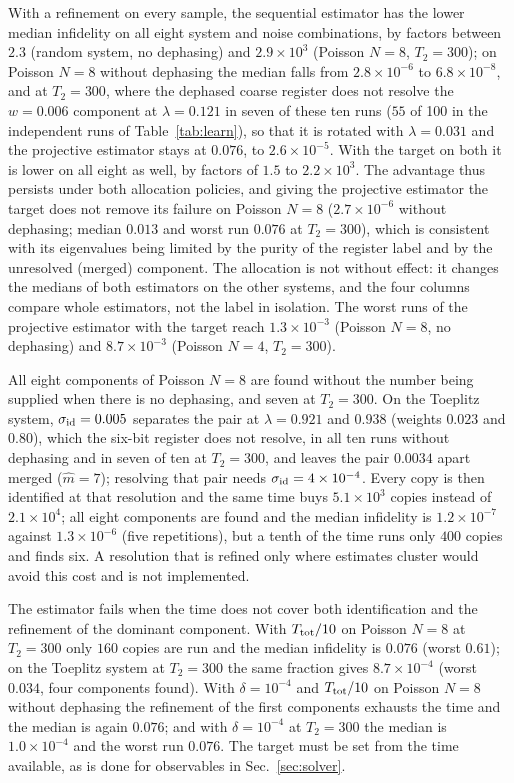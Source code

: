 \documentclass[journal]{IEEEtran}
\begin{document}
With a refinement on every sample, the sequential estimator has the lower median infidelity on all eight system and noise combinations, by factors between $2.3$ (random system, no dephasing) and $2.9\times10^3$ (Poisson $N=8$, $T_2=300$); on Poisson $N=8$ without dephasing the median falls from $2.8\times10^{-6}$ to $6.8\times10^{-8}$, and at $T_2=300$, where the dephased coarse register does not resolve the $w=0.006$ component at $\lambda=0.121$ in seven of these ten runs ($55$ of 100 in the independent runs of Table~\ref{tab:learn}), so that it is rotated with $\lambda=0.031$ and the projective estimator stays at $0.076$, to $2.6\times10^{-5}$. With the target on both it is lower on all eight as well, by factors of $1.5$ to $2.2\times10^3$. The advantage thus persists under both allocation policies, and giving the projective estimator the target does not remove its failure on Poisson $N=8$ ($2.7\times10^{-6}$ without dephasing; median $0.013$ and worst run $0.076$ at $T_2=300$), which is consistent with its eigenvalues being limited by the purity of the register label and by the unresolved (merged) component. The allocation is not without effect: it changes the medians of both estimators on the other systems, and the four columns compare whole estimators, not the label in isolation. The worst runs of the projective estimator with the target reach $1.3\times10^{-3}$ (Poisson $N=8$, no dephasing) and $8.7\times10^{-3}$ (Poisson $N=4$, $T_2=300$).

All eight components of Poisson $N=8$ are found without the number being supplied when there is no dephasing, and seven at $T_2=300$. On the Toeplitz system, $\sigma_{\rm id}=0.005$ separates the pair at $\lambda=0.921$ and $0.938$ (weights $0.023$ and $0.80$), which the six-bit register does not resolve, in all ten runs without dephasing and in seven of ten at $T_2=300$, and leaves the pair $0.0034$ apart merged ($\hat m=7$); resolving that pair needs $\sigma_{\rm id}=4\times10^{-4}$. Every copy is then identified at that resolution and the same time buys $5.1\times10^3$ copies instead of $2.1\times10^4$; all eight components are found and the median infidelity is $1.2\times10^{-7}$ against $1.3\times10^{-6}$ (five repetitions), but a tenth of the time runs only $400$ copies and finds six. A resolution that is refined only where estimates cluster would avoid this cost and is not implemented.

The estimator fails when the time does not cover both identification and the refinement of the dominant component. With $T_{\rm tot}/10$ on Poisson $N=8$ at $T_2=300$ only $160$ copies are run and the median infidelity is $0.076$ (worst $0.61$); on the Toeplitz system at $T_2=300$ the same fraction gives $8.7\times10^{-4}$ (worst $0.034$, four components found). With $\delta=10^{-4}$ and $T_{\rm tot}/10$ on Poisson $N=8$ without dephasing the refinement of the first components exhausts the time and the median is again $0.076$; and with $\delta=10^{-4}$ at $T_2=300$ the median is $1.0\times10^{-4}$ and the worst run $0.076$. The target must be set from the time available, as is done for observables in Sec.~\ref{sec:solver}.
\end{document}
